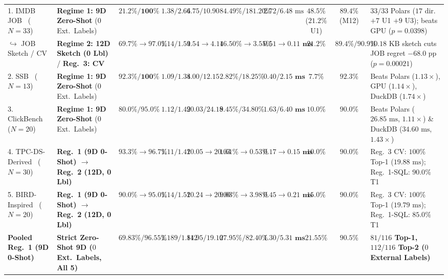 \documentclass[10pt,a4paper]{article}
\newenvironment{fitasttable}{%
  \begin{lrbox}{\asttblbox}%
}{%
  \end{lrbox}%
  \sbox{\asttblboxB}{%
    \ifdim\wd\asttblbox>0.96\textwidth
      \resizebox{0.96\textwidth}{!}{\usebox{\asttblbox}}%
    \else
      \usebox{\asttblbox}%
    \fi
  }%
  \ifdim\ht\asttblboxB>0.72\textheight
    \resizebox{!}{0.72\textheight}{\usebox{\asttblboxB}}%
  \else
    \usebox{\asttblboxB}%
  \fi
}
\begin{document}
\begin{table}[!htbp]
\begin{fitasttable}
\begin{tabular}{@{}llcccccccl@{}}
1. IMDB JOB~\cite{leis2015job} ($N=33$) & \textbf{Regime 1: 9D Zero-Shot} (0 Ext.\ Labels) & $21.2\% / \mathbf{100\%}$ & $1.38 / 2.64$ & $6.75 / 10.90$ & $84.49\% / 181.20\%$ & $2.72 / 6.48\text{ ms}$ & $48.5\%$ ($21.2\%$ U1) & $89.4\%$ (M12) & $33/33$ Polars ($17$ dir.\ $+ 7$ U1 $+ 9$ U3); beats GPU ($p=0.0398$) \\
\hspace*{0.8em}$\hookrightarrow$ JOB Sketch / CV & \textbf{Regime 2: 12D Sketch (0 Lbl)} / \textbf{Reg.\ 3: CV} & $\mathbf{69.7\%\rightarrow 97.0\%}$ & $\mathbf{1.14 / 1.59}$ & $\mathbf{4.54\rightarrow 4.14}$ & $\mathbf{16.50\%\rightarrow 3.55\%}$ & $\mathbf{0.51\rightarrow 0.11\text{ ms}}$ & $21.2\%$ & $\mathbf{89.4\% / 90.9\%}$ & $10.18\text{ KB}$ sketch cuts JOB regret $-68.0\text{ pp}$ ($p=0.00021$) \\
2. SSB~\cite{oneil2009ssb} ($N=13$) & \textbf{Regime 1: 9D Zero-Shot} (0 Ext.\ Labels) & $\mathbf{92.3\% / 100\%}$ & $\mathbf{1.09 / 1.34}$ & $\mathbf{8.00 / 12.15}$ & $\mathbf{2.82\% / 18.25\%}$ & $\mathbf{0.40 / 2.15\text{ ms}}$ & $7.7\%$ & $\mathbf{92.3\%}$ & Beats Polars ($1.13\times$), GPU ($1.14\times$), DuckDB ($1.74\times$) \\
3. ClickBench~\cite{clickbench2022} ($N=20$) & \textbf{Regime 1: 9D Zero-Shot} (0 Ext.\ Labels) & $\mathbf{80.0\% / 95.0\%}$ & $\mathbf{1.12 / 1.49}$ & $\mathbf{20.03 / 24.18}$ & $\mathbf{9.45\% / 34.80\%}$ & $\mathbf{1.63 / 6.40\text{ ms}}$ & $10.0\%$ & $\mathbf{90.0\%}$ & Beats Polars ($26.85\text{ ms}$, $1.11\times$) \& DuckDB ($34.60\text{ ms}$, $1.43\times$) \\
4. TPC-DS-Derived~\cite{nambiar2006tpcds} ($N=30$) & \textbf{Reg.\ 1 (9D 0-Shot) $\rightarrow$ Reg.\ 2 (12D, 0 Lbl)} & $\mathbf{93.3\%\rightarrow 96.7\%}$ & $\mathbf{1.11 / 1.41}$ & $\mathbf{20.05\rightarrow 20.03}$ & $\mathbf{1.61\%\rightarrow 0.53\%}$ & $\mathbf{0.17\rightarrow 0.15\text{ ms}}$ & $10.0\%$ & $\mathbf{90.0\%}$ & Reg.\ 3 CV: $100\%$ Top-1 ($19.88\text{ ms}$); Reg.\ 1-SQL: $90.0\%$ T1 \\
5. BIRD-Inspired~\cite{li2023bird} ($N=20$) & \textbf{Reg.\ 1 (9D 0-Shot) $\rightarrow$ Reg.\ 2 (12D, 0 Lbl)} & $\mathbf{90.0\%\rightarrow 95.0\%}$ & $\mathbf{1.14 / 1.51}$ & $\mathbf{20.24\rightarrow 20.00}$ & $\mathbf{9.03\%\rightarrow 3.98\%}$ & $\mathbf{0.45\rightarrow 0.21\text{ ms}}$ & $15.0\%$ & $\mathbf{90.0\%}$ & Reg.\ 3 CV: $100\%$ Top-1 ($19.79\text{ ms}$); Reg.\ 1-SQL: $85.0\%$ T1 \\
\midrule
\textbf{Pooled Reg.\ 1 (9D 0-Shot)} & \textbf{Strict Zero-Shot 9D ($0$ Ext.\ Labels, All 5)} & $\mathbf{69.83\% / 96.55\%}$ & $\mathbf{1.189 / 1.812}$ & $\mathbf{14.95 / 19.10}$ & $\mathbf{27.95\% / 82.40\%}$ & $\mathbf{1.30 / 5.31\text{ ms}}$ & $\mathbf{21.55\%}$ & $\mathbf{90.5\%}$ & \textbf{$81/116$ Top-1, $112/116$ Top-2 ($0$ External Labels)} \\

\end{tabular}
\end{fitasttable}
\end{table}
\end{document}
